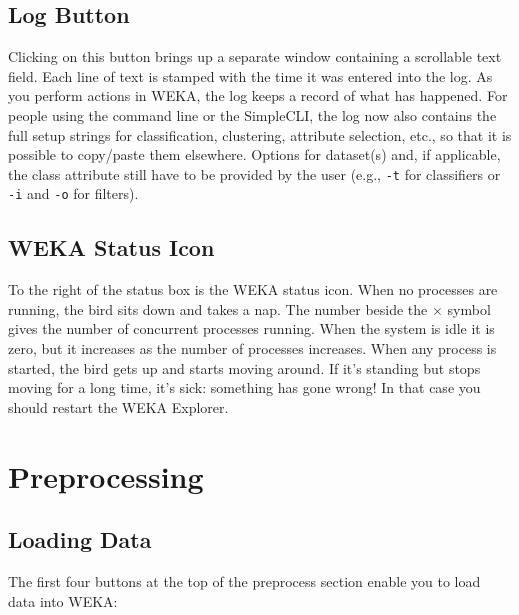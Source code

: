 \documentclass[a4paper]{article}
\begin{document}
\subsection{Log Button}

Clicking on this button brings up a separate window containing a scrollable text
field. Each line of text is stamped with the time it was entered into the
log. As you perform actions in WEKA, the log keeps a record of what has
happened. For people using the command line or the SimpleCLI, the log now also 
contains the full setup strings for classification, clustering, attribute selection, 
etc., so that it is possible to copy/paste them elsewhere. 
Options for dataset(s) and, if applicable, the class attribute still have to 
be provided by the user (e.g., \texttt{-t} for classifiers or \texttt{-i} 
and \texttt{-o} for filters).

\subsection{WEKA Status Icon}

To the right of the status box is the WEKA status icon. When no processes are
running, the bird sits down and takes a nap. The number beside the $\times$
symbol gives the number of concurrent processes running.  When the system is
idle it is zero, but it increases as the number of processes increases.
When any process is started, the bird gets up and starts moving around. If
it's standing but stops moving for a long time, it's sick: something has gone
wrong!  In that case you should restart the WEKA Explorer.

\newpage

\section{Preprocessing}

\begin{center}
\end{center}

\subsection{Loading Data}

The first four buttons at the top of the preprocess section enable
you to load data into WEKA:
\end{document}
